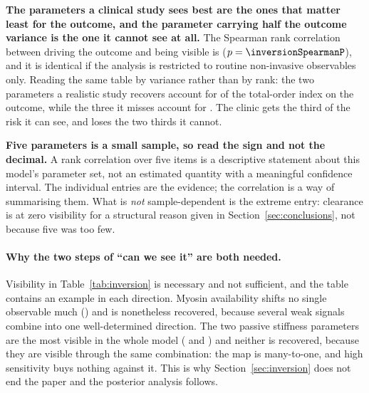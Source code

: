 \documentclass[11pt,a4paper]{article}
\newcommand{\claim}[1]{\textcolor{accent}{\textbf{#1}}}
\newcommand{\caution}[1]{\textcolor{warn}{\textbf{#1}}}
\begin{document}


\medskip

\claim{The parameters a clinical study sees best are the ones that matter least for the
outcome, and the parameter carrying half the outcome variance is the one it cannot see at
all.} The Spearman rank correlation between driving the outcome and being visible is
\inversionSpearman{} ($p=\inversionSpearmanP$), and it is identical if the analysis is
restricted to routine non-invasive observables only. Reading the same table by variance
rather than by rank: the two parameters a realistic study recovers account for
\driverMassRecoverable{} of the total-order index on the outcome, while the three it misses
account for \driverMassLost{}. The clinic gets the third of the risk it can see, and loses
the two thirds it cannot.

\caution{Five parameters is a small sample, so read the sign and not the decimal.} A rank
correlation over five items is a descriptive statement about this model's parameter set, not
an estimated quantity with a meaningful confidence interval. The individual entries are the
evidence; the correlation is a way of summarising them. What is \emph{not} sample-dependent
is the extreme entry: clearance is at zero visibility for a structural reason given in
Section~\ref{sec:conclusions}, not because five was too few.

\paragraph{Why the two steps of ``can we see it'' are both needed.} Visibility in
Table~\ref{tab:inversion} is necessary and not sufficient, and the table contains an example
in each direction. Myosin availability shifts no single observable much
(\bestSTPhiBaseline{}) and is nonetheless recovered, because several weak signals combine
into one well-determined direction. The two passive stiffness parameters are the most visible
in the whole model (\bestSTAPasKpa{} and \bestSTBPas{}) and neither is recovered, because
they are visible through the same combination: the map is many-to-one, and high sensitivity
buys nothing against it. This is why Section~\ref{sec:inversion} does not end the paper and
the posterior analysis follows.
\end{document}
